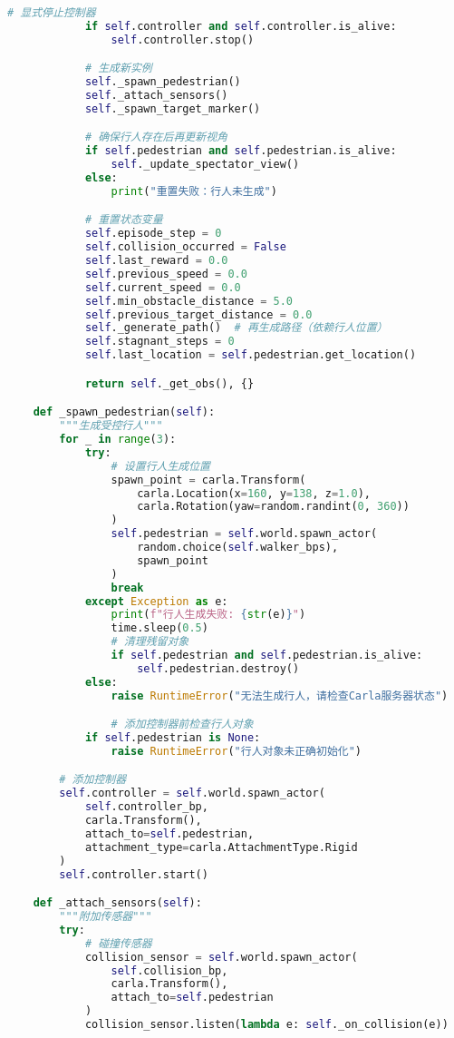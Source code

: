 \begin{lstlisting}[language=Python]
            # 显式停止控制器
            if self.controller and self.controller.is_alive:
                self.controller.stop()

            # 生成新实例
            self._spawn_pedestrian()
            self._attach_sensors()
            self._spawn_target_marker()

            # 确保行人存在后再更新视角
            if self.pedestrian and self.pedestrian.is_alive:
                self._update_spectator_view()
            else:
                print("重置失败：行人未生成")

            # 重置状态变量
            self.episode_step = 0
            self.collision_occurred = False
            self.last_reward = 0.0
            self.previous_speed = 0.0
            self.current_speed = 0.0
            self.min_obstacle_distance = 5.0
            self.previous_target_distance = 0.0
            self._generate_path()  # 再生成路径（依赖行人位置）
            self.stagnant_steps = 0
            self.last_location = self.pedestrian.get_location()

            return self._get_obs(), {}

    def _spawn_pedestrian(self):
        """生成受控行人"""
        for _ in range(3):
            try:
                # 设置行人生成位置
                spawn_point = carla.Transform(
                    carla.Location(x=160, y=138, z=1.0),
                    carla.Rotation(yaw=random.randint(0, 360))
                )
                self.pedestrian = self.world.spawn_actor(
                    random.choice(self.walker_bps),
                    spawn_point
                )
                break
            except Exception as e:
                print(f"行人生成失败: {str(e)}")
                time.sleep(0.5)
                # 清理残留对象
                if self.pedestrian and self.pedestrian.is_alive:
                    self.pedestrian.destroy()
            else:
                raise RuntimeError("无法生成行人，请检查Carla服务器状态")

                # 添加控制器前检查行人对象
            if self.pedestrian is None:
                raise RuntimeError("行人对象未正确初始化")

        # 添加控制器
        self.controller = self.world.spawn_actor(
            self.controller_bp,
            carla.Transform(),
            attach_to=self.pedestrian,
            attachment_type=carla.AttachmentType.Rigid
        )
        self.controller.start()

    def _attach_sensors(self):
        """附加传感器"""
        try:
            # 碰撞传感器
            collision_sensor = self.world.spawn_actor(
                self.collision_bp,
                carla.Transform(),
                attach_to=self.pedestrian
            )
            collision_sensor.listen(lambda e: self._on_collision(e))


\end{lstlisting}
